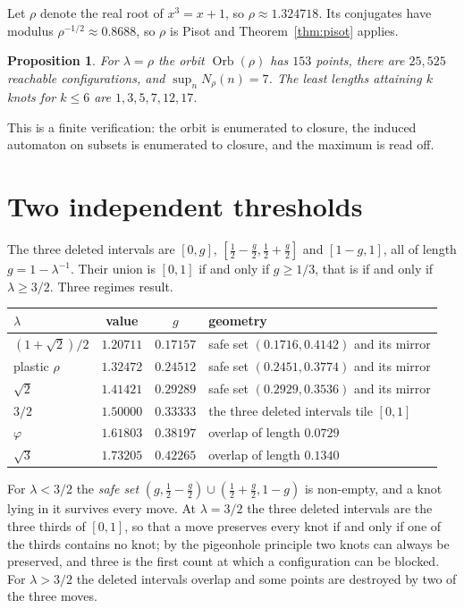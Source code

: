 \documentclass[11pt,reqno]{amsart}
\theoremstyle{plain}
\newtheorem{proposition}[theorem]{Proposition}
\theoremstyle{definition}
\theoremstyle{remark}
\DeclareMathOperator{\Orb}{Orb}
\begin{document}
Let $\rho$ denote the real root of $x^3=x+1$, so $\rho\approx1.324718$. Its
conjugates have modulus $\rho^{-1/2}\approx0.8688$, so $\rho$ is Pisot and
Theorem~\ref{thm:pisot} applies.

\begin{proposition}\label{prop:plastic}
For $\lambda=\rho$ the orbit $\Orb(\rho)$ has $153$ points, there are $25{,}525$
reachable configurations, and $\sup_n N_\rho(n)=7$. The least lengths attaining
$k$ knots for $k\leq6$ are $1,3,5,7,12,17$.
\end{proposition}

This is a finite verification: the orbit is enumerated to closure, the induced
automaton on subsets is enumerated to closure, and the maximum is read off.

\section{Two independent thresholds}\label{sec:thresholds}

The three deleted intervals are $[0,g]$, $[\tfrac12-\tfrac g2,\tfrac12+\tfrac
g2]$ and $[1-g,1]$, all of length $g=1-\lambda^{-1}$. Their union is $[0,1]$ if
and only if $g\geq1/3$, that is if and only if $\lambda\geq3/2$. Three regimes
result.

\begin{center}
\begin{tabular}{lccl}
\toprule
$\lambda$ & value & $g$ & geometry\\
\midrule
$(1+\sqrt2)/2$ & $1.20711$ & $0.17157$ & safe set $(0.1716,0.4142)$ and its mirror\\
plastic $\rho$ & $1.32472$ & $0.24512$ & safe set $(0.2451,0.3774)$ and its mirror\\
$\sqrt2$ & $1.41421$ & $0.29289$ & safe set $(0.2929,0.3536)$ and its mirror\\
$3/2$ & $1.50000$ & $0.33333$ & the three deleted intervals tile $[0,1]$\\
$\varphi$ & $1.61803$ & $0.38197$ & overlap of length $0.0729$\\
$\sqrt3$ & $1.73205$ & $0.42265$ & overlap of length $0.1340$\\
\bottomrule
\end{tabular}
\end{center}

For $\lambda<3/2$ the \emph{safe set}
$(g,\tfrac12-\tfrac g2)\cup(\tfrac12+\tfrac g2,1-g)$ is non-empty, and a knot
lying in it survives every move. At $\lambda=3/2$ the three deleted intervals
are the three thirds of $[0,1]$, so that a move preserves every knot if and only
if one of the thirds contains no knot; by the pigeonhole principle two knots can
always be preserved, and three is the first count at which a configuration can
be blocked. For $\lambda>3/2$ the deleted intervals overlap and some points are
destroyed by two of the three moves.
\end{document}
